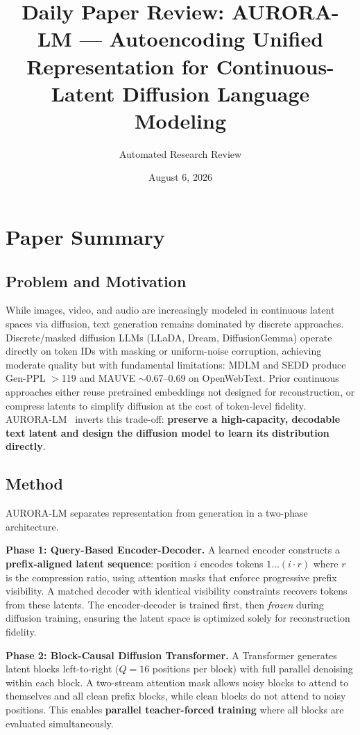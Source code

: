 \documentclass[11pt,a4paper]{article}
\title{Daily Paper Review: AURORA-LM --- Autoencoding Unified Representation for Continuous-Latent Diffusion Language Modeling}
\author{Automated Research Review}
\date{August 6, 2026}
\begin{document}
\maketitle

\section{Paper Summary}

\subsection{Problem and Motivation}
While images, video, and audio are increasingly modeled in continuous latent spaces via diffusion, text generation remains dominated by discrete approaches. Discrete/masked diffusion LLMs (LLaDA, Dream, DiffusionGemma) operate directly on token IDs with masking or uniform-noise corruption, achieving moderate quality but with fundamental limitations: MDLM and SEDD produce Gen-PPL $>$119 and MAUVE $\sim$0.67--0.69 on OpenWebText. Prior continuous approaches either reuse pretrained embeddings not designed for reconstruction, or compress latents to simplify diffusion at the cost of token-level fidelity. AURORA-LM~\cite{liang2026aurora} inverts this trade-off: \textbf{preserve a high-capacity, decodable text latent and design the diffusion model to learn its distribution directly}.

\subsection{Method}
AURORA-LM separates representation from generation in a two-phase architecture.

\textbf{Phase 1: Query-Based Encoder-Decoder.} A learned encoder constructs a \textbf{prefix-aligned latent sequence}: position $i$ encodes tokens $1 \ldots (i \cdot r)$ where $r$ is the compression ratio, using attention masks that enforce progressive prefix visibility. A matched decoder with identical visibility constraints recovers tokens from these latents. The encoder-decoder is trained first, then \emph{frozen} during diffusion training, ensuring the latent space is optimized solely for reconstruction fidelity.

\textbf{Phase 2: Block-Causal Diffusion Transformer.} A Transformer generates latent blocks left-to-right ($Q = 16$ positions per block) with full parallel denoising within each block. A two-stream attention mask allows noisy blocks to attend to themselves and all clean prefix blocks, while clean blocks do not attend to noisy positions. This enables \textbf{parallel teacher-forced training} where all blocks are evaluated simultaneously.
\end{document}
